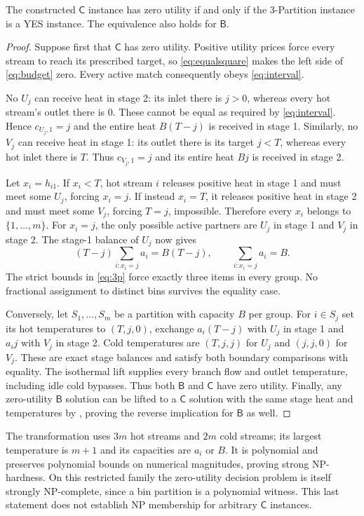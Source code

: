 \documentclass[11pt,a4paper]{report}
\newcommand{\CC}{\mathsf{C}}
\newcommand{\BB}{\mathsf{B}}
\begin{document}
\begin{lemma}\label{lem:reduction}
The constructed $\CC$ instance has zero utility if and only if the
3-Partition instance is a YES instance. The equivalence also holds for $\BB$.
\end{lemma}
\begin{proof}
Suppose first that $\CC$ has zero utility. Positive utility prices force every
stream to reach its prescribed target, so \eqref{eq:equalsquare} makes the
left side of \eqref{eq:budget} zero. Every active match consequently obeys
\eqref{eq:interval}.

No $U_j$ can receive heat in stage 2: its inlet there is $j>0$, whereas every
hot stream's outlet there is 0. These cannot be equal as required by
\eqref{eq:interval}. Hence $c_{U_j,1}=j$ and the entire heat $B(T-j)$ is
received in stage 1. Similarly, no $V_j$ can receive heat in stage 1:
its outlet there is its target $j<T$, whereas every hot inlet there is $T$.
Thus $c_{V_j,1}=j$ and its entire heat $Bj$ is received in stage 2.

Let $x_i=h_{i1}$. If $x_i<T$, hot stream $i$ releases positive heat in stage 1
and must meet some $U_j$, forcing $x_i=j$. If instead $x_i=T$, it releases
positive heat in stage 2 and must meet some $V_j$, forcing $T=j$, impossible.
Therefore every $x_i$ belongs to $\{1,\ldots,m\}$. For $x_i=j$, the only
possible active partners are $U_j$ in stage 1 and $V_j$ in stage 2.
The stage-1 balance of $U_j$ now gives
\begin{equation}\label{eq:bins}
 (T-j)\sum_{i:x_i=j}a_i=B(T-j),\qquad
 \sum_{i:x_i=j}a_i=B.
\end{equation}
The strict bounds in \eqref{eq:3p} force exactly three items in every group.
No fractional assignment to distinct bins survives the equality case.

Conversely, let $S_1,\ldots,S_m$ be a partition with capacity $B$ per group.
For $i\in S_j$ set its hot temperatures to $(T,j,0)$, exchange
$a_i(T-j)$ with $U_j$ in stage 1 and $a_i j$ with $V_j$ in stage 2.
Cold temperatures are $(T,j,j)$ for $U_j$ and $(j,j,0)$ for $V_j$.
These are exact stage balances and satisfy both boundary comparisons with
equality. The isothermal lift supplies every branch flow and outlet
temperature, including idle cold bypasses. Thus both $\BB$ and $\CC$ have
zero utility. Finally, any zero-utility $\BB$ solution can be lifted to a
$\CC$ solution with the same stage heat and temperatures by
, proving the reverse implication for $\BB$ as well.
\end{proof}
The transformation uses $3m$ hot streams and $2m$ cold streams; its largest
temperature is $m+1$ and its capacities are $a_i$ or $B$. It is polynomial
and preserves polynomial bounds on numerical magnitudes, proving strong
NP-hardness. On this restricted family the zero-utility decision problem is
itself strongly NP-complete, since a bin partition is a polynomial witness.
This last statement does not establish NP membership for arbitrary $\CC$
instances.
\end{document}
